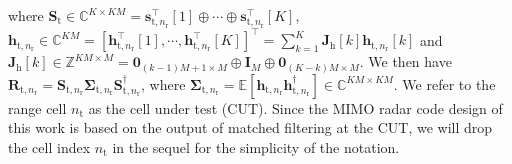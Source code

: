 \documentclass[10pt,journal]{IEEEtran}
\newcommand{\paren}[1]{\left({#1}\right)}
\newcommand{\bracket}[1]{{\left [{#1}\right ]}}
\newcommand{\rr}{_\mathrm{r}}
\newcommand{\target}{\mathrm{t}}
\theoremstyle{definition}
\begin{document}
where  $\mathbf{S}_{\mathrm{t}}\in\mathbb{C}^{K\times KM}=\mathbf{s}^\top_{\target,n\rr}\bracket{1}\oplus\cdots\oplus\mathbf{s}^\top_{\target,n\rr}\bracket{K}$, $\mathbf{h}_{\mathrm{t},n\rr}\in\mathbb{C}^{KM}=\bracket{\mathbf{h}^\top_{\target,n\rr}\bracket{1},\cdots,\mathbf{h}^\top_{\target,n\rr}\bracket{K}}^\top=\sum_{k=1}^{K}\mathbf{J}_{\textrm{h}}\bracket{k}\mathbf{h}_{\target,n\rr}\bracket{k}$ and $\mathbf{J}_{\mathrm{h}}\bracket{k}\in\mathbb{Z}^{KM\times M}=\mathbf{0}_{\paren{k-1}M+1\times M}\oplus\mathbf{I}_{M}\oplus\mathbf{0}_{\paren{K-k}M\times M}$. We then have $\mathbf{R}_{\target,n\rr}=\mathbf{S}_{\target,n\rr}\boldsymbol{\Sigma}_{\target,n\rr}\mathbf{S}^\dagger_{\target,n\rr}$, where $\boldsymbol{\Sigma}_{\target,n\rr}=\mathbb{E}\bracket{\mathbf{h}_{\target,n\rr}\mathbf{h}^\dagger_{\target,n\rr}}\in\mathbb{C}^{KM\times KM}$.
We refer to the range cell $n_\target$ as the cell under test (CUT). Since the MIMO radar code design of this work is based on the output of matched filtering at the CUT, we will drop the cell index $n_\target$ in the sequel for the simplicity of the notation.
\end{document}
